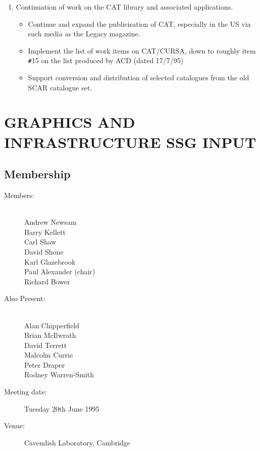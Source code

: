 \begin{enumerate}
\item Continuation of work on the CAT library and associated
applications.

\begin{itemize}
\item Continue and expand the publicisation of CAT, especially in the
US via such media as the Legacy magazine.

\item Implement the list of work items on CAT/CURSA, down to roughly
item \verb/#/15 on the list produced by ACD (dated 17/7/95)

\item Support conversion and distribution of selected catalogues from
the old SCAR catalogue set.

\end{itemize}
\end{enumerate}

\newpage
\section{GRAPHICS AND INFRASTRUCTURE SSG INPUT}

\subsection{Membership}

\begin{description}
\item[Members:]\mbox{}\\
Andrew Newsam\\
Barry Kellett\\
Carl Shaw\\
David Shone\\
Karl Glazebrook\\
Paul Alexander (chair)\\
Richard Bower

\item[Also Present:]\mbox{}\\
Alan Chipperfield\\
Brian McIlwrath\\
David Terrett\\
Malcolm Currie\\
Peter Draper\\
Rodney Warren-Smith

\item[Meeting date:]Tuesday 20th June 1995

\item[Venue:]Cavendish Laboratory, Cambridge
\end{description}

